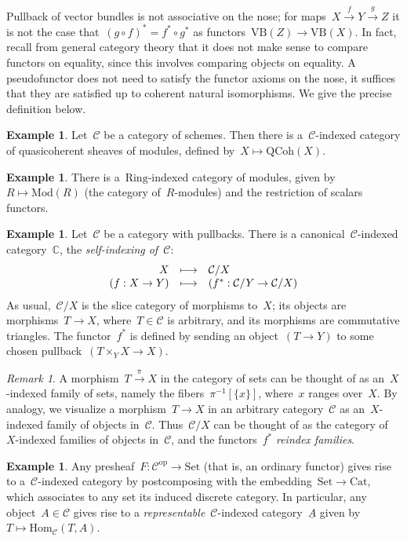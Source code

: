 \documentclass[a4paper,english,12pt]{scrartcl}
\theoremstyle{definition}
\newtheorem{ex}[defn]{Example}
\theoremstyle{plain}
\theoremstyle{remark}
\newtheorem{rem}[defn]{Remark}
\newcommand{\CC}{\mathbb{C}}
\newcommand{\C}{\mathcal{C}}
\newcommand{\op}{\mathrm{op}}
\newcommand{\xra}[1]{\xrightarrow{#1}}
\newcommand{\Mod}{\mathrm{Mod}}
\newcommand{\Set}{\mathrm{Set}}
\newcommand{\Cat}{\mathrm{Cat}}
\newcommand{\VB}{\mathrm{VB}}
\newcommand{\QCoh}{\mathrm{QCoh}}
\newcommand{\Hom}{\mathrm{Hom}}
\newcommand{\ul}[1]{\underline{#1}}
\begin{document}
Pullback of vector bundles is not associative on the nose; for maps~$X \xra{f}
Y \xra{g} Z$ it is not the case that~$(g \circ f)^* = f^* \circ g^*$ as
functors~$\VB(Z) \to \VB(X)$. In fact, recall from general category theory that
it does not make sense to compare functors on equality, since this involves
comparing objects on equality. A pseudofunctor does not need to satisfy the
functor axioms on the nose, it suffices that they are satisfied up to coherent
natural isomorphisms. We give the precise definition below.

\begin{ex}Let~$\C$ be a category of schemes. Then there is a~$\C$-indexed
category of quasicoherent sheaves of modules, defined by~$X \mapsto \QCoh(X)$.
\end{ex}

\begin{ex}There is a~$\mathrm{Ring}$-indexed category of modules, given by~$R
\mapsto \Mod(R)$ (the category of~$R$-modules) and the restriction of scalars
functors.
\end{ex}

\begin{ex}\label{ex:self-indexing}Let~$\C$ be a category with pullbacks. There
is a canonical~$\C$-indexed category~$\CC$, the \emph{self-indexing of~$\C$}:
\[ \begin{array}{@{}rcl@{}}
  X &\longmapsto& \C/X \\
  (f : X \to Y) &\longmapsto&
    (f^* : \C/Y \to \C/X)
\end{array} \]
As usual,~$\C/X$ is the slice category of morphisms to~$X$; its objects are
morphisms~$T \to X$, where~$T \in \C$ is arbitrary, and its morphisms are
commutative triangles. The functor~$f^*$ is defined by sending an object~$(T
\to Y)$ to some chosen pullback~$(T \times_Y X \to X)$.\end{ex}

\begin{rem}A morphism~$T \xra{\pi} X$ in the category of sets can be thought of as
an~$X$-indexed family of sets, namely the fibers~$\pi^{-1}[\{x\}]$, where~$x$
ranges over~$X$. By analogy, we visualize a morphism~$T \to X$ in an arbitrary
category~$\C$ as an~$X$-indexed family of objects in~$\C$. Thus~$\C/X$ can be
thought of as the category of~$X$-indexed families of objects in~$\C$, and the
functors~$f^*$ \emph{reindex families}.
\end{rem}

\begin{ex}\label{ex:presheaf}Any presheaf~$F : \C^\op \to \Set$ (that is, an ordinary functor)
gives rise to a~$\C$-indexed category by postcomposing with the embedding~$\Set
\to \Cat$, which associates to any set its induced discrete category. In
particular, any object~$A \in \C$ gives rise to a \emph{representable}~$\C$-indexed
category~$\ul{A}$ given by~$T \mapsto \Hom_\C(T,A)$.
\end{ex}
\end{document}
